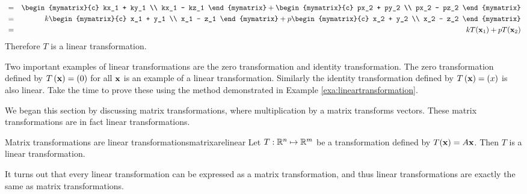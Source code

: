 \begin{solution}
\begin{eqnarray*}
&=& \begin{mymatrix}{c} kx_1 + ky_1 \\ kx_1 - kz_1 \end{mymatrix} + \begin{mymatrix}{c} px_2 + py_2 \\  px_2 - pz_2 \end{mymatrix} \\
&=& k \begin{mymatrix}{c} x_1 + y_1 \\ x_1 - z_1 \end{mymatrix} + p \begin{mymatrix}{c} x_2 + y_2 \\  x_2 - z_2 \end{mymatrix} \\
&=& k T(\vect{x}_1) + p T(\vect{x}_2) 
\end{eqnarray*}
Therefore $T$ is a linear transformation. 
\end{solution}

Two important examples of linear transformations are the zero transformation and identity transformation. The zero transformation defined by $T\left( {\bf x} \right) = {\bf (}0)$ for all ${\bf x}$ is an example of a linear transformation. Similarly the identity transformation defined by $T\left( {\bf x} \right) = {\bf (}x)$ is also linear. Take the time to prove these using the method demonstrated in Example \ref{exa:lineartransformation}.

We began this section by discussing matrix transformations, where multiplication by a matrix transforms vectors. These matrix transformations are in fact linear transformations. 

\begin{theorem}{Matrix transformations are linear transformations}{matrixarelinear}
Let $T:\mathbb{R}^{n}\mapsto \mathbb{R}^{m}$ be a transformation defined by $T({\bf x}) = A{\bf x}$. Then $T$ is a linear transformation. 
\end{theorem}

It turns out that every linear transformation can be expressed as a matrix transformation, and thus linear transformations are exactly the same as matrix transformations. 
